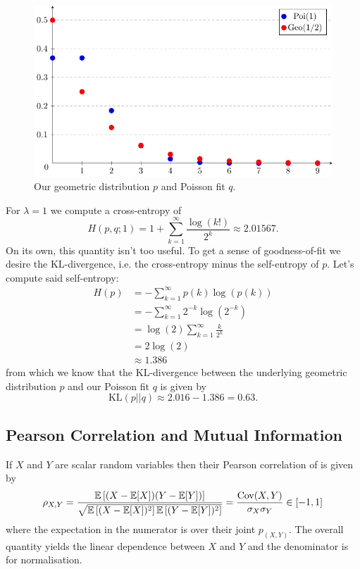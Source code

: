\documentclass[11pt]{article}
\begin{document}
\begin{appendices}
\begin{figure}[t]
    \centering
    \includegraphics[width=\columnwidth]{./figures/appendix/poi_geo_plot.pdf}
    \caption{Our geometric distribution $p$ and Poisson fit $q$.}
    \label{fig:poi_geo_plot}
\end{figure}

For $\lambda=1$ we compute a cross-entropy of
$$
H(p,q;1)
=
1+\sum_{k=1}^{\infty}\frac{\log(k!)}{2^k}
\approx
2.01567.
$$
On its own, this quantity isn't too useful. To get a sense of goodness-of-fit we desire the KL-divergence, i.e. the cross-entropy minus the self-entropy of $p$. Let's compute said self-entropy:
\begin{align*}
    H(p)
    &=
    -\sum_{k=1}^{\infty}p(k)\log(p(k))\\
    &=
    -\sum_{k=1}^{\infty}2^{-k}\log(2^{-k})\\
    &=
    \log(2)\sum_{k=1}^{\infty}\frac{k}{2^k}\\
    &=
    2\log(2)\\
    &\approx
    1.386
\end{align*}
from which we know that the KL-divergence between the underlying geometric distribution $p$ and our Poisson fit $q$ is given by
$$
\text{KL}(p||q)
\approx
2.016-1.386
=
0.63.
$$

\subsection{Pearson Correlation and Mutual Information}
\label{app:pearson_correlation}
If $X$ and $Y$ are scalar random variables then their Pearson correlation of is given by
$$
\rho_{X,Y}
=
\frac{\mathbb{E}\left[(X-\mathbb{E}[X])(Y-\mathbb{E}[Y])\right]}{\sqrt{\mathbb{E}\left[(X-\mathbb{E}[X])^2\right]\mathbb{E}\left[(Y-\mathbb{E}[Y])^2\right]}}
=
\frac{\text{Cov}(X,Y)}{\sigma_X\sigma_Y}
\in[-1,1]
$$
where the expectation in the numerator is over their joint $p_{(X,Y)}$. The overall quantity yields the linear dependence between $X$ and $Y$ and the denominator is for normalisation.


\end{appendices}
\end{document}

